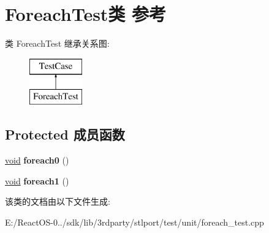 \hypertarget{class_foreach_test}{}\section{Foreach\+Test类 参考}
\label{class_foreach_test}
类 Foreach\+Test 继承关系图\+:\begin{figure}[H]
\begin{center}
\leavevmode
\includegraphics[height=2.000000cm]{class_foreach_test}
\end{center}
\end{figure}
\subsection*{Protected 成员函数}
\begin{DoxyCompactItemize}
\item 
\mbox{\label{class_foreach_test_ad73292f3398b121470e171f50ec3afbf}} 
\hyperlink{interfacevoid}{void} {\bfseries foreach0} ()
\item 
\mbox{\label{class_foreach_test_a4176e1590b64c2d55048d28ac73d1b9e}} 
\hyperlink{interfacevoid}{void} {\bfseries foreach1} ()
\end{DoxyCompactItemize}


该类的文档由以下文件生成\+:\begin{DoxyCompactItemize}
\item 
E\+:/\+React\+O\+S-\/0../sdk/lib/3rdparty/stlport/test/unit/foreach\+\_\+test.\+cpp\end{DoxyCompactItemize}

